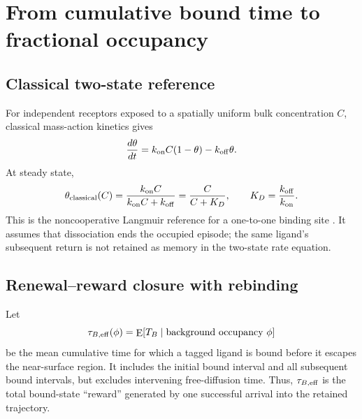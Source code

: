 \section{From cumulative bound time to fractional occupancy}
\label{sec:occupancy}

\subsection{Classical two-state reference}

For independent receptors exposed to a spatially uniform bulk concentration
$C$, classical mass-action kinetics gives
\begin{equation}
 \frac{d\theta}{dt}=k_{\mathrm{on}} C(1-\theta)-k_{\mathrm{off}}\theta.
 \label{eq:langmuir-kinetics}
\end{equation}
At steady state,
\begin{equation}
 \theta_{\mathrm{classical}}(C)
 =\frac{k_{\mathrm{on}} C}{k_{\mathrm{on}} C+k_{\mathrm{off}}}
 =\frac{C}{C+K_D},
 \qquad K_D=\frac{k_{\mathrm{off}}}{k_{\mathrm{on}}}.
 \label{eq:langmuir-isotherm}
\end{equation}
This is the noncooperative Langmuir reference for a one-to-one binding site
\citep{langmuir1918}.  It assumes that dissociation ends the occupied episode;
the same ligand's subsequent return is not retained as memory in the
two-state rate equation.

\subsection{Renewal--reward closure with rebinding}

Let
\begin{equation}
 \tau_{B,\mathrm{eff}}(\phi)=\mathop{\mathrm{E}}[T_B\mid\text{background occupancy }\phi]
 \label{eq:effective-bound-time}
\end{equation}
be the mean cumulative time for which a tagged ligand is bound before it
escapes the near-surface region.  It includes the initial bound interval and
all subsequent bound intervals, but excludes intervening free-diffusion time.
Thus, $\tau_{B,\mathrm{eff}}$ is the total bound-state ``reward'' generated by one successful
arrival into the retained trajectory.

